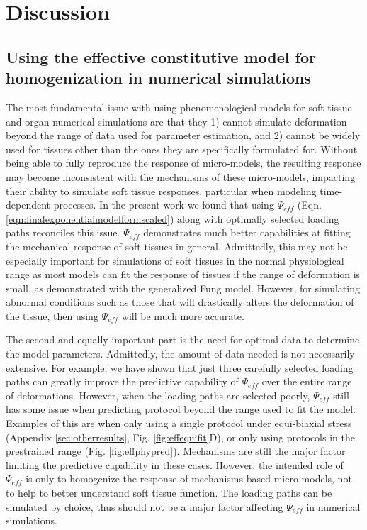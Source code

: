 
\section{Discussion}

\subsection{Using the effective constitutive model for homogenization in numerical simulations}

	The most fundamental issue with using phenomenological models for soft tissue and organ numerical simulations are that they 1) cannot simulate deformation beyond the range of data used for parameter estimation, and 2) cannot be widely used for tissues other than the ones they are specifically formulated for. Without being able to fully reproduce the response of micro-models, the resulting response may become inconsistent with the mechanisms of these micro-models, impacting their ability to simulate soft tissue responses, particular when modeling time-dependent processes. In the present work we found that using $\Psi_{eff}$ (Eqn. \ref{eqn:finalexponentialmodelformscaled}) along with optimally selected loading paths reconciles this issue. $\Psi_{eff}$ demonstrates much better capabilities at fitting the mechanical response of soft tissues in general. Admittedly, this may not be especially important for simulations of soft tissues in the normal physiological range as most models can fit the response of tissues if the range of deformation is small, as demonstrated with the generalized Fung model. However, for simulating abnormal conditions such as those that will drastically alters the deformation of the tissue, then using $\Psi_{eff}$ will be much more accurate. 
    
    
    The second and equally important part is the need for optimal data to determine the model parameters. Admittedly, the amount of data needed is not necessarily extensive. For example, we have shown that just three carefully selected loading paths can greatly improve the predictive capability of $\Psi_{eff}$ over the entire range of deformations. However, when the loading paths are selected poorly, $\Psi_{eff}$ still has some issue when predicting protocol beyond the range used to fit the model. Examples of this are when only using a single protocol under equi-biaxial stress (Appendix \ref{sec:otherresults}, Fig. \ref{fig:effequifit}D), or only using protocols in the prestrained range (Fig. \ref{fig:effphypred}). Mechanisms are still the major factor limiting the predictive capability in these cases. However, the intended role of $\Psi_{eff}$ is only to homogenize the response of mechanisms-based micro-models, not to help to better understand soft tissue function. The loading paths can be simulated by choice, thus should not be a major factor affecting $\Psi_{eff}$ in numerical simulations. 
    
